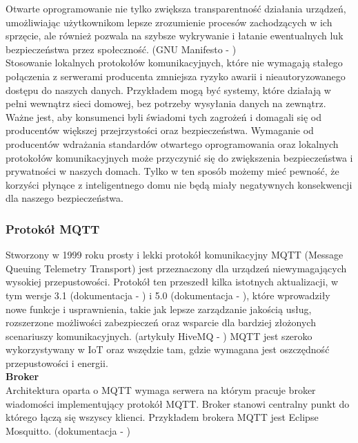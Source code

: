 Otwarte oprogramowanie nie tylko zwiększa transparentność działania urządzeń, umożliwiając użytkownikom lepsze zrozumienie procesów zachodzących w ich sprzęcie, ale również pozwala na szybsze wykrywanie i łatanie ewentualnych luk bezpieczeństwa przez społeczność. (GNU Manifesto - \cite{gnumanifesto})\\

Stosowanie lokalnych protokołów komunikacyjnych, które nie wymagają stałego połączenia z serwerami producenta zmniejsza ryzyko awarii i nieautoryzowanego dostępu do naszych danych. Przykładem mogą być systemy, które działają w pełni wewnątrz sieci domowej, bez potrzeby wysyłania danych na zewnątrz.\\

Ważne jest, aby konsumenci byli świadomi tych zagrożeń i domagali się od producentów większej przejrzystości oraz bezpieczeństwa. Wymaganie od producentów wdrażania standardów otwartego oprogramowania oraz lokalnych protokołów komunikacyjnych może przyczynić się do zwiększenia bezpieczeństwa i prywatności w naszych domach. Tylko w ten sposób możemy mieć pewność, że korzyści płynące z inteligentnego domu nie będą miały negatywnych konsekwencji dla naszego bezpieczeństwa.

\newpage

\subsubsection{Protokół MQTT}
Stworzony w 1999 roku prosty i lekki protokół komunikacyjny MQTT (Message Queuing Telemetry Transport) jest przeznaczony dla urządzeń niewymagających wysokiej przepustowości. Protokół ten przeszedł kilka istotnych aktualizacji, w tym wersje 3.1 (dokumentacja - \cite{mqtt3spec}) i 5.0 (dokumentacja - \cite{mqtt5spec}), które wprowadziły nowe funkcje i usprawnienia, takie jak lepsze zarządzanie jakością usług, rozszerzone możliwości zabezpieczeń oraz wsparcie dla bardziej złożonych scenariuszy komunikacyjnych. (artykuły HiveMQ - \cite{mqtt5part1}\cite{mqtt5part2}) MQTT jest szeroko wykorzystywany w IoT oraz wszędzie tam, gdzie wymagana jest oszczędność przepustowości i energii.\\

\hypertarget{broker}{}
\textbf{Broker}\\
Architektura oparta o MQTT wymaga serwera na którym pracuje broker wiadomości implementujący protokół MQTT. Broker stanowi centralny punkt do którego łączą się wszyscy klienci. Przykładem brokera MQTT jest Eclipse Mosquitto. (dokumentacja - \cite{mosquittodocs})\\


